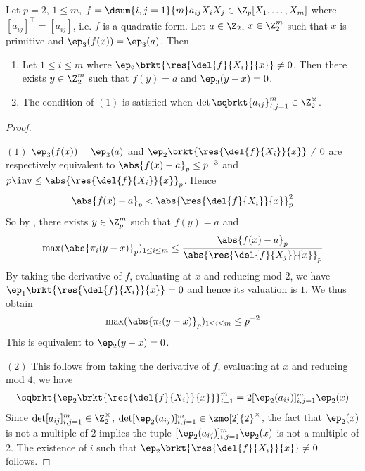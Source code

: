 \begin{prop}[Lifting Solutions of Quadratic Forms for $p = 2$]
  
  Let $p = 2$, $1 \leq m$, 
  $f = \dsum{i,j = 1}{m} a_{ij}X_iX_j \in \Z_p[X_1,\dots,X_m]$ where 
  $[a_{ij}]^\top = [a_{ij}]$, i.e. $f$ is a quadratic form. 
  Let $a \in \Z_2$, $x \in \Z_2^m$ such that 
  $x$ is primitive and $\ep_3(f(x)) = \ep_3(a)$. 
  Then \begin{enumerate}
    \item Let $1 \leq i \leq m$ where 
    $\ep_2\brkt{\res{\del{f}{X_i}}{x}} \neq 0$.
    Then there exists $y \in \Z_2^m$ such that $f(y) = a$ and 
    $\ep_3(y - x) = 0$. 
    \item The condition of $(1)$ is satisfied when 
    $\det\sqbrkt{a_{ij}}_{i,j = 1}^m \in \Z_2^\times$. 
  \end{enumerate}
\end{prop}
\begin{proof}~

  $(1)$
  $\ep_3(f(x)) = \ep_3(a)$ and 
  $\ep_2\brkt{\res{\del{f}{X_i}}{x}} \neq 0$ are respectively equivalent to
  $\abs{f(x) - a}_p \leq p^{-3}$ and $p\inv \leq \abs{\res{\del{f}{X_i}}{x}}_p$.
  Hence \[
    \abs{f(x) - a}_p < \abs{\res{\del{f}{X_i}}{x}}_p^2
  \]
  So by , 
  there exists $y \in \Z_p^m$ such that 
  $f(y) = a$ and \[
    \max(\abs{\pi_i(y - x)}_p)_{1\leq i \leq m} 
    \leq \frac{\abs{f(x) - a}_p}{\abs{\res{\del{f}{X_j}}{x}}_p}
  \]
  By taking the derivative of $f$, evaluating at $x$ and 
  reducing mod $2$, we have $\ep_1\brkt{\res{\del{f}{X_i}}{x}} = 0$ 
  and hence its valuation is $1$.
  We thus obtain \[
    \max(\abs{\pi_i(y - x)}_p)_{1\leq i \leq m} 
    \leq p^{-2}
  \]
  This is equivalent to $\ep_2(y - x) = 0$.

  $(2)$ This follows from taking the derivative of $f$,
  evaluating at $x$ and reducing mod $4$, we have 
  \begin{align*}
    \sqbrkt{\ep_2\brkt{\res{\del{f}{X_i}}{x}}}_{i = 1}^m 
    = 2 [\ep_2(a_{ij})]_{i,j = 1}^m \ep_2(x)
  \end{align*}
  Since $\det [a_{ij}]_{i,j = 1}^m \in \Z_2^\times$, 
  $\det [\ep_2(a_{ij})]_{i,j = 1}^m \in \zmo[2]{2}^\times$,
  the fact that $\ep_2(x)$ is not a multiple of $2$ implies the tuple
  $[\ep_2(a_{ij})]_{i,j = 1}^m \ep_2(x)$ is not a multiple of $2$.
  The existence of $i$ such that $\ep_2\brkt{\res{\del{f}{X_i}}{x}} \neq 0$
  follows. 
\end{proof}


